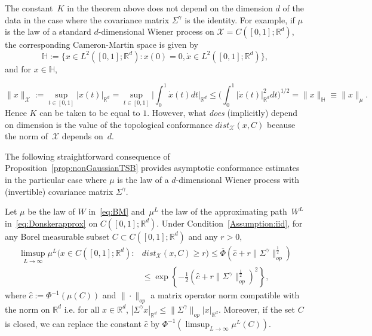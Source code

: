 \documentclass[twoside,11pt]{article}
\numberwithin{equation}{section}
\numberwithin{theorem}{section}
\newcommand{\R}{\mathbb{R}}
\newcommand{\X}{\mathcal{X}}
\newcommand{\Hh}{\mathbb{H}}
\begin{document}
\begin{remark} 
The constant~$K$ in the theorem above does not depend on the dimension $d$ of the data in the case where the covariance matrix $\Sigma^\gamma$ is the identity.
For example, if $\mu$ is the law of a standard $d$-dimensional Wiener process on $\X=C([0,1];\R^d)$, the corresponding Cameron-Martin space is given by $$
\Hh:=\bigg\{ x\in L^2([0,1];\R^d): x(0)=0, \dot{x}\in L^2([0,1];\R^d)\bigg\},
$$
and for $x\in\Hh$,

$$
\|x\|_{\X} :=
\sup_{t\in[0, 1]}| x(t)|_{\R^d}=\sup_{t\in[0, 1] }\bigg|\int_{0}^{1} \dot{x}(t)dt\bigg|_{\R^d}\leq \bigg(\int_{0}^{1} |\dot{x}(t)|^2_{\R^d}dt \bigg)^{1/2}=\|x\|_{\Hh}\equiv\|x\|_{\mu}. $$ 
Hence $K$ can be taken to be equal to $1$. However, what \textit{does} (implicitly) depend on dimension is the value of the topological conformance $dist_{\X}(x, C)$ because the norm of~$\X$ depends on~$d$.
\end{remark}
The following straightforward consequence of Proposition~\ref{prop:nonGaussianTSB} provides asymptotic conformance estimates in the particular case where $\mu$ is the law of a $d$-dimensional Wiener process with (invertible) covariance matrix $\Sigma^\gamma$.
\begin{corollary}\label{cor:donsker} Let $\mu$ be the law of $W$ in~\eqref{eq:BM} and~$\mu^L$ the law of the approximating path~$W^L$ in~\eqref{eq:Donskerapprox}  on $C([0,1]; \R^d)$. 
Under Condition~\ref{Assumption:iid}, for any Borel measurable subset $C\subset C([0,1];\R^d)$ and any $r>0$,
\begin{equation}\label{eq:Sigmabnd}
\begin{aligned}
   \limsup_{L\to\infty}\mu^L\bigg( x\in C([0,1];\R^d): & dist_\X(x, C)\geq r     \bigg)
 \leq \overline{\Phi}\left(\widehat{c}+r\|\Sigma^\gamma\|^{\frac{1}{2}}_{op}\right)\\&\leq 
 \exp\left\{-\frac{1}{2}\left(\widehat{c}+r\|\Sigma^\gamma\|^{\frac{1}{2}}_{op}\right)^2\right\}, 
\end{aligned}
\end{equation}
where $\widehat{c}:=\Phi^{-1}(\mu(C))$ and $\|\cdot\|_{op}$ a matrix operator norm compatible with the norm on $\R^d$ i.e. for all $x\in\R^d$, $|\Sigma^\gamma x|_{\R^d}\leq \|\Sigma^\gamma\|_{op}|x|_{\R^d}$. Moreover, if the set $C$ is closed, we can replace the constant $\widehat{c}$ by $\Phi^{-1}(\limsup_{L\to\infty}\mu^L(C))$.
\end{corollary}
\end{document}
